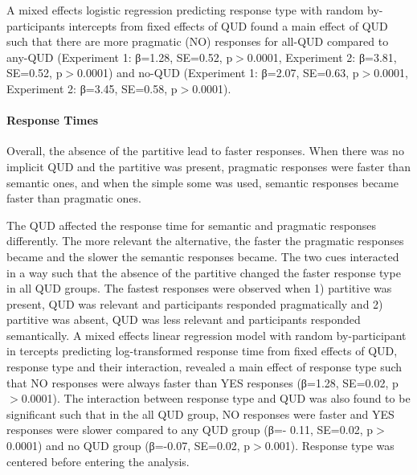 \documentclass[12pt]{article}
\begin{document}
A mixed effects logistic regression predicting response type with random by-participants intercepts from fixed effects of QUD found a main effect of QUD such that there are more pragmatic (NO) responses for all-QUD compared to any-QUD (Experiment 1: β=1.28, SE=0.52, p$>$0.0001, Experiment 2: β=3.81, SE=0.52, p$>$0.0001) and no-QUD (Experiment 1: β=2.07, SE=0.63, p$>$0.0001, Experiment 2: β=3.45, SE=0.58, p$>$0.0001).

\paragraph{Response Times}
Overall, the absence of the partitive lead to faster responses. When there was no implicit QUD and the partitive was present, pragmatic responses were faster than semantic ones, and when the simple some was used, semantic responses became faster than pragmatic ones.

The QUD affected the response time for semantic and pragmatic responses differently. The more relevant the alternative, the faster the pragmatic responses became and the slower the semantic responses became.
The two cues interacted in a way such that the absence of the partitive changed the faster response type in all QUD groups. The fastest responses were observed when 1) partitive was present, QUD was relevant and participants responded pragmatically and 2) partitive was absent, QUD was less relevant and participants responded semantically.
A mixed effects linear regression model with random by-participant in tercepts predicting log-transformed response time from fixed effects of QUD, response type and their interaction, revealed a main effect of response type such that NO responses were always faster than YES responses (β=1.28, SE=0.02, p$>$0.0001). The interaction between response type and QUD was also found to be significant such that in the all QUD group, NO responses were faster and YES responses were slower compared to any QUD group (β=- 0.11, SE=0.02, p$>$0.0001) and no QUD group (β=-0.07, SE=0.02, p$>$0.001). Response type was centered before entering the analysis.
\end{document}
